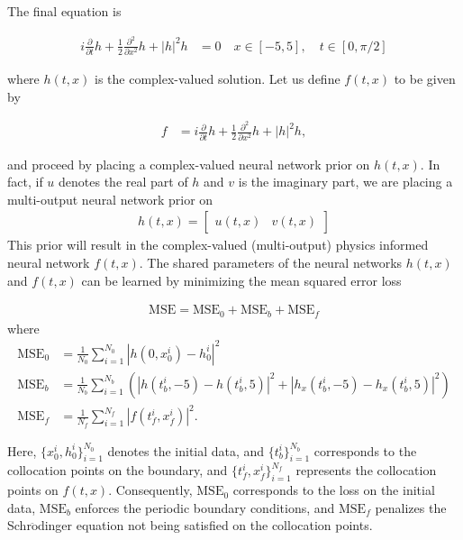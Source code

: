 \documentclass[book.tex]{subfiles}
\begin{document}
The final equation is 

\begin{align}
i \frac{\partial}{\partial t} h + \frac{1}{2} \frac{\partial^2}{\partial x^2} h + |h|^2 h &= 0\quad x \in [-5, 5],\quad t \in [0, \pi/2]
\end{align}

where $h(t,x)$ is the complex-valued solution. Let us define $f(t,x)$ to be given by

\begin{align}
f &= i \frac{\partial}{\partial t} h + \frac{1}{2} \frac{\partial^2}{\partial x^2} h + |h|^2 h,
\end{align}

and proceed by placing a complex-valued neural network prior on $h(t,x)$. In fact, if $u$ denotes the real part of $h$ and $v$ is the imaginary part, we are placing a multi-output neural network prior on 
\begin{align}
h(t,x) = \begin{bmatrix} u(t,x) & v(t,x)
\end{bmatrix}
\end{align}
This prior will result in the complex-valued (multi-output) physics informed neural network $f(t,x)$. The shared parameters of the neural networks $h(t,x)$ and $f(t,x)$ can be learned by minimizing the mean squared error loss

\begin{align}
    \textrm{MSE} = \textrm{MSE}_0 + \textrm{MSE}_b + \textrm{MSE}_f    
\end{align}
where
\begin{align}
\textrm{MSE}_0 &= \frac{1}{N_0}\sum_{i=1}^{N_0} |h(0,x_0^i) - h^i_0|^2\\
\textrm{MSE}_b &= \frac{1}{N_b}\sum_{i=1}^{N_b} \left(|h(t^i_b,-5) - h(t^i_b,5)|^2 + |h_x(t^i_b,-5) - h_x(t^i_b,5)|^2\right)\\ 
\textrm{MSE}_f &= \frac{1}{N_f}\sum_{i=1}^{N_f}|f(t_f^i,x_f^i)|^2.    
\end{align}

Here, $\{x_0^i, h^i_0\}_{i=1}^{N_0}$ denotes the initial data, and $\{t^i_b\}_{i=1}^{N_b}$ corresponds to the collocation points on the boundary, and $\{t_f^i,x_f^i\}_{i=1}^{N_f}$ represents the collocation points on $f(t,x)$. Consequently, $\textrm{MSE}_0$ corresponds to the loss on the initial data, $\textrm{MSE}_b$ enforces the periodic boundary conditions, and $\textrm{MSE}_f$ penalizes the Schr$\mathrm{\ddot{o}}$dinger equation not being satisfied on the collocation points.
\end{document}
